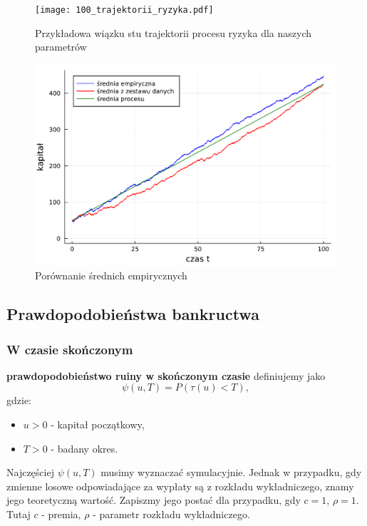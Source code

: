 \documentclass{article}
\theoremstyle{break}
\numberwithin{equation}{subsection}
\numberwithin{figure}{section}
\begin{document}
\begin{figure}[H]
	\center
	\texttt{[image: 100\_trajektorii\_ryzyka.pdf]}
	\caption{Przykładowa wiązku stu trajektorii procesu ryzyka dla naszych parametrów}
	\label{fig: 7}
\end{figure}

\begin{figure}[H]
	\center
	\includegraphics[scale=0.35]{porównanie_średnich_procesu_ryzyka.pdf}
	\caption{Porównanie średnich empirycznych}
	\label{fig: 8}
\end{figure}

\subsection{Prawdopodobieństwa bankructwa}

\subsubsection{W czasie skończonym}

\textbf{prawdopodobieństwo ruiny w skończonym czasie} definiujemy jako
\begin{equation}
\psi(u,T)=P(\tau(u)<T),
\end{equation}
gdzie:
\begin{itemize}
\item $u > 0$ - kapitał początkowy,
\item $T > 0$ - badany okres.
\end{itemize}

Najczęściej $\psi(u,T)$ musimy wyznaczać symulacyjnie. Jednak w przypadku, gdy zmienne losowe odpowiadające za wypłaty są z rozkładu wykładniczego, znamy jego teoretyczną wartość. Zapiszmy jego postać dla przypadku, gdy $c=1$, $\rho = 1$. \\
Tutaj $c$ - premia, $\rho$ - parametr rozkładu wykładniczego.
\end{document}
